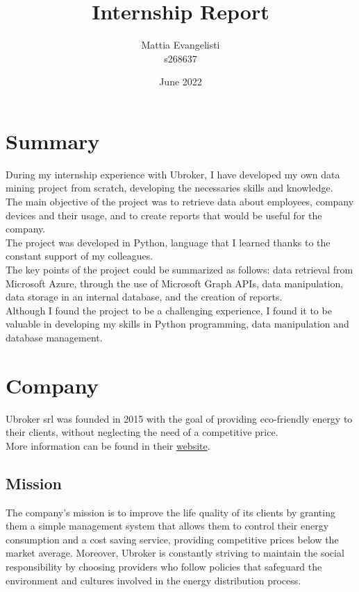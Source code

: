 \documentclass[12pt, a4paper, oneside]{article}
\title{\huge Internship Report}
\author{Mattia Evangelisti \\ s268637}
\date{June 2022}
\begin{document}
\begin{titlepage}
    \maketitle
\end{titlepage}

\tableofcontents
\clearpage\null\newpage


\newpage
\section{Summary}
During my internship experience with Ubroker, I have developed my own data mining project from scratch, developing the necessaries skills and knowledge.\\
The main objective of the project was to retrieve data about employees, company devices and their usage, and to create reports that would be useful for the company.\\
The project was developed in Python, language that I learned thanks to the constant support of my colleagues.\\
The key points of the project could be summarized as follows: data retrieval from Microsoft Azure, through the use of Microsoft Graph APIs, data manipulation, data storage in an internal database,
and the creation of reports.\\
Although I found the project to be a challenging experience, I found it to be valuable in developing my skills in Python programming, data manipulation and database management.\\


\newpage
\section{Company}
Ubroker srl was founded in 2015 with the goal of providing eco-friendly energy to their clients, without neglecting the need of a competitive price.\\
More information can be found in their \href{https://ubroker.it/}{website}.
\subsection{Mission}
The company's mission is to improve the life quality of its clients by granting them a simple management system that allows them to control their energy consumption and a cost saving service, providing 
competitive prices below the market average. Moreover, Ubroker is constantly striving to maintain the social responsibility by choosing providers who follow policies that safeguard the environment and cultures
involved in the energy distribution process.
\end{document}
